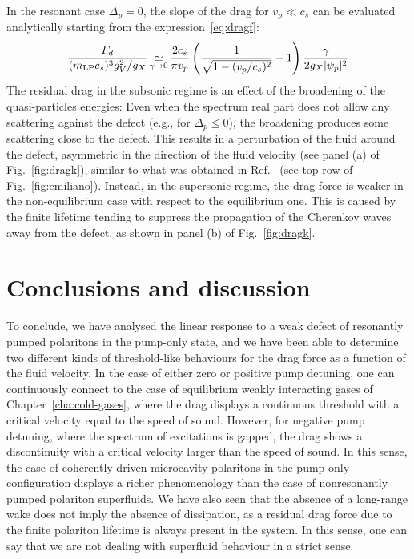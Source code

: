 In the resonant case $\Delta_p=0$, the slope of the
drag for $v_p \ll c_s$ can be evaluated analytically starting from the
expression~\eqref{eq:dragf}:
%
\begin{equation*}
    \frac{F_d}{(m_{\text{LP}}c_s)^3 g_V^2/g_X} \mathop{\simeq}\limits_{\gamma \to 0} \frac{2 c_s}{\pi
      v_p} \left( \frac{1}{ \sqrt{1-(v_p/c_s)^2}} - 1 \right)
    \frac{\gamma}{2g_X |\psi_p|^2}
\end{equation*}
%
The residual drag in the subsonic regime is an effect of the
broadening of the quasi-particles energies: Even when the spectrum
real part does not allow any scattering against the defect (e.g., for
$\Delta_p \le 0$), the broadening produces some scattering close to
the defect. This results in a perturbation of the fluid around the
defect, asymmetric in the direction of the fluid velocity (see panel
(a) of Fig.~\ref{fig:dragk}), similar to what was obtained in
Ref.~\cite{Cancellieri_2010} (see top row of
Fig.~\ref{fig:emiliano}). Instead, in the supersonic regime, the drag
force is weaker in the non-equilibrium case with respect to the
equilibrium one. This is caused by the finite lifetime tending to
suppress the propagation of the Cherenkov waves away from the defect,
as shown in panel (b) of Fig.~\ref{fig:dragk}.


\section{Conclusions and discussion}
\label{sec:concl}
%
To conclude, we have analysed the linear response to a weak defect of
resonantly pumped polaritons in the pump-only state, and we have been
able to determine two different kinds of threshold-like behaviours for
the drag force as a function of the fluid velocity. In the case of
either zero or positive pump detuning, one can continuously connect to
the case of equilibrium weakly interacting gases of
Chapter~\ref{cha:cold-gases}, where the drag displays a continuous
threshold with a critical velocity equal to the speed of
sound. However, for negative pump detuning, where the spectrum of
excitations is gapped, the drag shows a discontinuity with a critical
velocity larger than the speed of sound. In this sense, the case of
coherently driven microcavity polaritons in the pump-only
configuration displays a richer phenomenology than the case of
nonresonantly pumped polariton superfluids. We have also seen that the
absence of a long-range wake does not imply the absence of
dissipation, as a residual drag force due to the finite polariton
lifetime is always present in the system. In this sense, one can say
that we are not dealing with superfluid behaviour in a strict sense.

